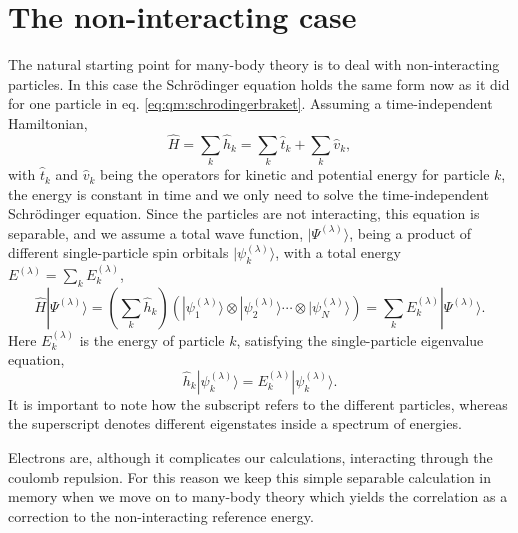 \section{The non-interacting case}
The natural starting point for many-body theory is to deal with non-interacting particles.
In this case the Schrödinger equation holds the same form now as it did for one particle in eq. \eqref{eq:qm:schrodingerbraket}.
Assuming a time-independent Hamiltonian,
\begin{equation}
\hat{H} = \sum_k \hat{h}_k =  \sum_k \hat{t}_k  + \sum_k \hat{v}_k ,
\end{equation}
with $\hat{t}_k$ and $\hat{v}_k$ being the operators for kinetic and potential energy for particle $k$, the energy is constant in time and we only need to solve the time-independent Schrödinger equation.
Since the particles are not interacting, this equation is separable, and we assume a total wave function, $|\Psi^{(\lambda)} \rangle$, being a product of different single-particle spin orbitals $|\psi_k^{(\lambda)}\rangle$, with a total energy $E^{(\lambda)}=\sum_k E_k^{(\lambda)}$,
\begin{equation}
\hat{H}|\Psi^{(\lambda)} \rangle = 
\left(\sum_k \hat{h}_k\right) \left(|\psi_1^{(\lambda)}\rangle \otimes |\psi_2^{(\lambda)}\rangle 
\cdots \otimes |\psi_N^{(\lambda)}\rangle \right)
=  \sum_k E_k^{(\lambda)} |\Psi^{(\lambda)} \rangle .
\end{equation}
Here $E_k^{(\lambda)}$ is the energy of particle $k$, satisfying the single-particle eigenvalue equation,
\begin{equation}
\label{eq:manybody:nonInter}
\hat{h}_k |\psi_k^{(\lambda)} \rangle = E_k^{(\lambda)} |\psi_k^{(\lambda)} \rangle .
\end{equation}
It is important to note how the subscript refers to the different particles, whereas the superscript denotes different eigenstates inside a spectrum of energies.

Electrons are, although it complicates our calculations, interacting through the coulomb repulsion. 
For this reason we keep this simple separable calculation in memory when we move on to many-body theory which yields the correlation as a correction to the non-interacting reference energy.



